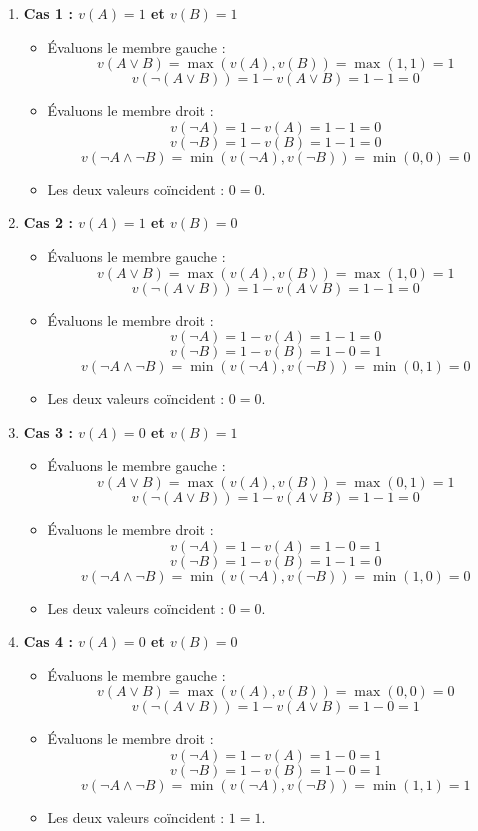 \documentclass[11pt,a4paper]{article}
\begin{document}
\begin{enumerate}
\def\labelenumi{\arabic{enumi}.}
\tightlist
\item
  \textbf{Cas 1 : \(v(A) = 1\) et \(v(B) = 1\)}

  \begin{itemize}
  \tightlist
  \item
    Évaluons le membre gauche :
    \[v(A \lor B) = \max(v(A), v(B)) = \max(1, 1) = 1\]
    \[v(\neg(A \lor B)) = 1 - v(A \lor B) = 1 - 1 = 0\]
  \item
    Évaluons le membre droit : \[v(\neg A) = 1 - v(A) = 1 - 1 = 0\]
    \[v(\neg B) = 1 - v(B) = 1 - 1 = 0\]
    \[v(\neg A \land \neg B) = \min(v(\neg A), v(\neg B)) = \min(0, 0) = 0\]
  \item
    Les deux valeurs coïncident : \(0 = 0\).
  \end{itemize}
\item
  \textbf{Cas 2 : \(v(A) = 1\) et \(v(B) = 0\)}

  \begin{itemize}
  \tightlist
  \item
    Évaluons le membre gauche :
    \[v(A \lor B) = \max(v(A), v(B)) = \max(1, 0) = 1\]
    \[v(\neg(A \lor B)) = 1 - v(A \lor B) = 1 - 1 = 0\]
  \item
    Évaluons le membre droit : \[v(\neg A) = 1 - v(A) = 1 - 1 = 0\]
    \[v(\neg B) = 1 - v(B) = 1 - 0 = 1\]
    \[v(\neg A \land \neg B) = \min(v(\neg A), v(\neg B)) = \min(0, 1) = 0\]
  \item
    Les deux valeurs coïncident : \(0 = 0\).
  \end{itemize}
\item
  \textbf{Cas 3 : \(v(A) = 0\) et \(v(B) = 1\)}

  \begin{itemize}
  \tightlist
  \item
    Évaluons le membre gauche :
    \[v(A \lor B) = \max(v(A), v(B)) = \max(0, 1) = 1\]
    \[v(\neg(A \lor B)) = 1 - v(A \lor B) = 1 - 1 = 0\]
  \item
    Évaluons le membre droit : \[v(\neg A) = 1 - v(A) = 1 - 0 = 1\]
    \[v(\neg B) = 1 - v(B) = 1 - 1 = 0\]
    \[v(\neg A \land \neg B) = \min(v(\neg A), v(\neg B)) = \min(1, 0) = 0\]
  \item
    Les deux valeurs coïncident : \(0 = 0\).
  \end{itemize}
\item
  \textbf{Cas 4 : \(v(A) = 0\) et \(v(B) = 0\)}

  \begin{itemize}
  \tightlist
  \item
    Évaluons le membre gauche :
    \[v(A \lor B) = \max(v(A), v(B)) = \max(0, 0) = 0\]
    \[v(\neg(A \lor B)) = 1 - v(A \lor B) = 1 - 0 = 1\]
  \item
    Évaluons le membre droit : \[v(\neg A) = 1 - v(A) = 1 - 0 = 1\]
    \[v(\neg B) = 1 - v(B) = 1 - 0 = 1\]
    \[v(\neg A \land \neg B) = \min(v(\neg A), v(\neg B)) = \min(1, 1) = 1\]
  \item
    Les deux valeurs coïncident : \(1 = 1\).
  \end{itemize}
\end{enumerate}
\end{document}
